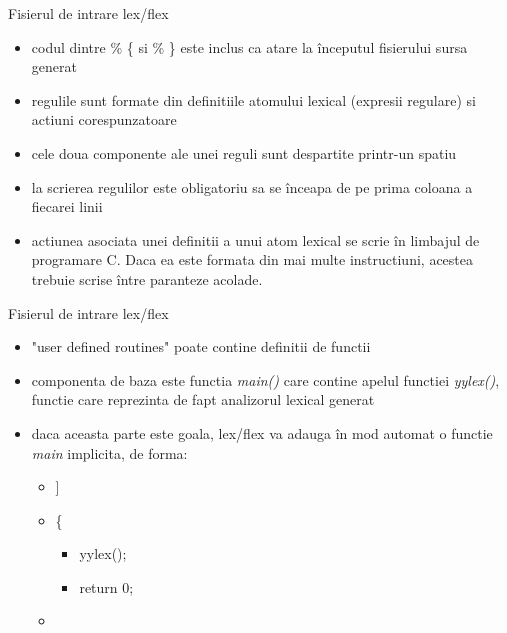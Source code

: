 \documentclass[pdf]{beamer}
\begin{document}
\begin{frame}{Fisierul de intrare lex/flex}
\begin{itemize}
\item
codul dintre \% \{ si \% \} este inclus ca atare la începutul fisierului sursa generat

\item
regulile sunt formate din definitiile atomului lexical (expresii regulare) si actiuni corespunzatoare

\item
cele doua componente ale unei reguli sunt despartite printr-un spatiu

\item
la scrierea regulilor este obligatoriu sa se înceapa de pe prima coloana a fiecarei linii

\item
actiunea asociata unei definitii a unui atom lexical se scrie în limbajul de programare C. Daca ea este formata din mai multe instructiuni, acestea trebuie scrise între paranteze acolade.

\end{itemize}
\end{frame}



\begin{frame}{Fisierul de intrare lex/flex}
\begin{itemize}
\item
"user defined routines" poate contine definitii de functii

\item
componenta de baza este functia \textit{main()} care contine apelul functiei \textit{yylex()}, functie care reprezinta de fapt analizorul lexical generat

\item
daca aceasta parte este goala, lex/flex va adauga în mod automat o functie \textit{main} implicita, de forma:

\begin{itemize}
	\item[]
     	\color{red}{int main(int argc, char *argv[])}]

        \item[]
        \color{black}\{

    	 \begin{itemize}
      		\item[]
        	 yylex();


         \item[]
          return 0;
              \end{itemize}


\item[]
\color{black}{\}}
     \end{itemize}
\end{itemize}
\end{frame}
\end{document}
